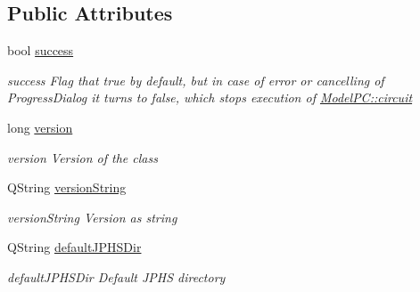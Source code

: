 \subsection*{Public Attributes}
\begin{DoxyCompactItemize}
\item 
bool \hyperlink{class_model_p_c_a945ffbbc44a832b953c191debd448f4c}{success}
\begin{DoxyCompactList}\small\item\em success Flag that true by default, but in case of error or cancelling of Progress\-Dialog it turns to false, which stops execution of \hyperlink{class_model_p_c_a1d0091062a0c836b283ec2f67411623b}{Model\-P\-C\-::circuit} \end{DoxyCompactList}\item 
long \hyperlink{class_model_p_c_a5af48ab89e19be42a94c34ba00249401}{version}
\begin{DoxyCompactList}\small\item\em version Version of the class \end{DoxyCompactList}\item 
Q\-String \hyperlink{class_model_p_c_a5f426725ccf7eefd3c77ea8c720264c9}{version\-String}
\begin{DoxyCompactList}\small\item\em version\-String Version as string \end{DoxyCompactList}\item 
Q\-String \hyperlink{class_model_p_c_abd038306f14f22fb885a1697c96d6335}{default\-J\-P\-H\-S\-Dir}
\begin{DoxyCompactList}\small\item\em default\-J\-P\-H\-S\-Dir Default J\-P\-H\-S directory \end{DoxyCompactList}\end{DoxyCompactItemize}
